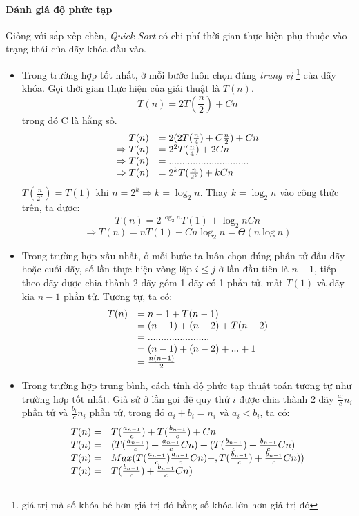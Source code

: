 \documentclass[a4paper,12pt]{report}
\begin{document}
\paragraph{Đánh giá độ phức tạp}
Giống với sắp xếp chèn, \emph{Quick Sort} có chi phí thời gian thực hiện phụ thuộc vào trạng thái của dãy khóa đầu vào.
\begin{itemize}
\item Trong trường hợp tốt nhất, ở mỗi bước luôn chọn đúng \emph{trung vị} \footnote{giá trị mà số khóa bé hơn giá trị đó bằng số khóa lớn hơn giá trị đó} của dãy khóa. Gọi thời gian thực hiện của giải thuật là $T(n)$.
$$T(n) = 2T(\frac{n}{2}) + Cn$$
trong đó C là hằng số.
\begin{displaymath}
\begin{array}{r l}
T(n) &= 2(2T(\frac{n}{4}) + C\frac{n}{2}) + Cn\\
\Rightarrow T(n) &= 2^2 T(\frac{n}{4}) + 2Cn\\
\Rightarrow T(n) &=..............................\\
\Rightarrow T(n) &= 2^k T(\frac{n}{2^k}) + kCn 
\end{array}
\end{displaymath}
$T(\frac{n}{2^k}) = T(1)$ khi $n = 2^k \Rightarrow k = \log_2 n$. Thay $k = \log_2 n$ vào công thức trên, ta được:\\
$$T(n) = 2^{\log_2{n}} T(1) + \log_2{n}Cn$$
$$\Rightarrow  T(n) = n T(1) + Cn\log_2{n} = \Theta(n \log n)$$
\item Trong trường hợp xấu nhất, ở mỗi bước ta luôn chọn đúng phần tử đầu dãy hoặc cuối dãy, số lần thực hiện vòng lặp $i\leq j$ ở lần đầu tiên là $n-1$, tiếp theo dãy được chia thành 2 dãy gồm 1 dãy có 1 phần tử, mất $T(1)$ và dãy kia $n-1$ phần tử. Tương tự, ta có:
\begin{displaymath}
\begin{array}{r l}
T(n) &= n-1 + T(n-1) \\
 &=  (n-1) + (n-2) + T(n-2)\\
 &= .......................\\
 &= (n-1) + (n-2) + ... + 1\\
 &= \frac{n(n-1)}{2}
\end{array}
\end{displaymath}
\item Trong trường hợp trung bình, cách tính độ phức tạp thuật toán tương tự như trường hợp tốt nhất. Giả sử ở lần gọi đệ quy thứ $i$ được chia thành 2 dãy $\frac{a_i}{c} n_i$ phần tử và $\frac{b_i}{c} n_i$ phần tử, trong đó $a_i + b_i = n_i$ và $a_i < b_i$, ta có:
\begin{displaymath}
\begin{array}{r l}
T(n)=& T(\frac{a_{n-1}}{c}) + T(\frac{b_{n-1}}{c}) + C n\\
T(n)=& (T(\frac{a_{n-1}}{c}) + \frac{a_{n-1}}{c}C n) + (T(\frac{b_{n-1}}{c}) + \frac{b_{n-1}}{c}C n)\\
T(n)=& Max(T(\frac{a_{n-1}}{c}) \frac{a_{n-1}}{c}C n)+ ,T(\frac{b_{n-1}}{c}) + \frac{b_{n-1}}{c}C n))\\
T(n)=& T(\frac{b_{n-1}}{c}) + \frac{b_{n-1}}{c}C n)
\end{array}
\end{displaymath}


\end{itemize}
\end{document}
